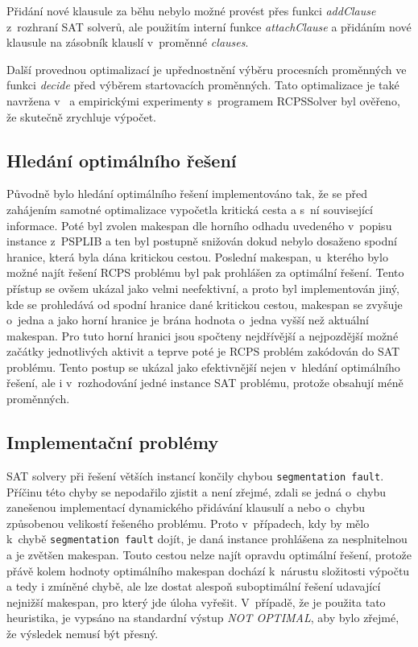 \documentclass[a4paper, 12pt]{article}
\begin{document}
Přidání nové klausule za běhu nebylo možné provést přes funkci \emph{addClause} z~rozhraní SAT solverů, ale použitím
interní funkce \emph{attachClause} a přidáním nové klausule na zásobník klauslí v~proměnné \emph{clauses}.

Další provednou optimalizací je upřednostnění výběru procesních proměnných ve funkci \emph{decide} před výběrem
startovacích proměnných.
Tato optimalizace je také navržena v~\cite{horbach:10} a empirickými experimenty s~programem RCPSSolver
byl ověřeno, že skutečně zrychluje výpočet.

\subsection{Hledání optimálního řešení}
Původně bylo hledání optimálního řešení implementováno tak, že se před
zahájením samotné optimalizace vypočetla kritická cesta a s~ní související informace.
Poté byl zvolen makespan dle horního odhadu uvedeného v~popisu instance z~PSPLIB
a ten byl postupně snižován dokud nebylo dosaženo spodní hranice, která
byla dána kritickou cestou.
Poslední makespan, u~kterého bylo možné najít řešení RCPS problému byl pak prohlášen
za optimální řešení.
Tento přístup se ovšem ukázal jako velmi neefektivní, a proto byl
implementován jiný, kde se prohledává od spodní hranice dané kritickou cestou,
makespan se zvyšuje o~jedna a jako horní hranice je brána hodnota o~jedna
vyšší než aktuální makespan.
Pro tuto horní hranici jsou spočteny nejdřívější a nejpozdější možné začátky
jednotlivých aktivit a teprve poté je RCPS problém zakódován do SAT problému.
Tento postup se ukázal jako efektivnější nejen v~hledání optimálního řešení, ale i
v~rozhodování jedné instance SAT problému, protože obsahují méně proměnných. 

\subsection{Implementační problémy}
\label{sub:impl}
SAT solvery při řešení větších instancí končily chybou \texttt{segmentation fault}.
Příčinu této chyby se nepodařilo zjistit a není zřejmé, zdali se jedná
o~chybu zanešenou implementací dynamického přidávání klausulí a nebo o~chybu
způsobenou velikostí řešeného problému.
Proto v~případech, kdy by mělo k~chybě \texttt{segmentation fault} dojít,
je daná instance prohlášena za nesplnitelnou a je zvětšen makespan.
Touto cestou nelze najít opravdu optimální řešení, protože přávě kolem
hodnoty optimálního makespan dochází k~nárustu složitosti výpočtu a tedy
i zmíněné chybě, ale lze dostat alespoň suboptimální řešení udavající
nejnižší makespan, pro který jde úloha vyřešit.
V~případě, že je použita tato heuristika, je vypsáno na standardní výstup
\emph{NOT OPTIMAL}, aby bylo zřejmé, že výsledek nemusí být přesný.
\end{document}
